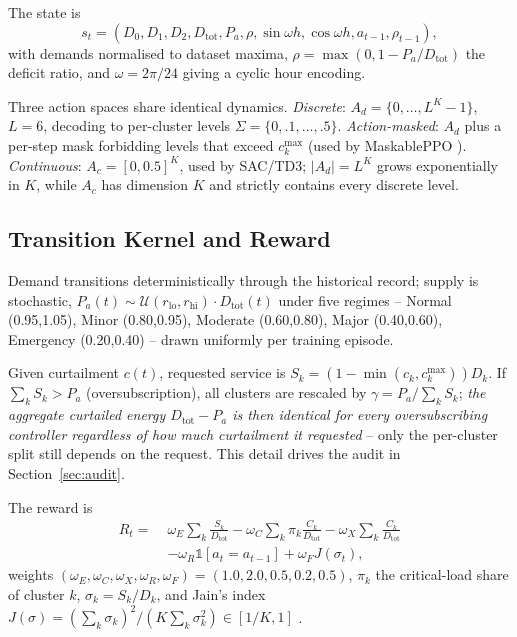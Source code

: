 \documentclass[9pt,conference]{IEEEtran}
\begin{document}
The state is
\begin{equation}
s_t=(D_0,D_1,D_2,D_{\mathrm{tot}},P_a,\rho,\sin\omega h,\cos\omega h,a_{t-1},\rho_{t-1}),
\label{eq:state}
\end{equation}
with demands normalised to dataset maxima, $\rho=\max(0,1-P_a/D_{\mathrm{tot}})$ the deficit ratio, and $\omega=2\pi/24$ giving a cyclic hour encoding.

Three action spaces share identical dynamics. \emph{Discrete}: $A_d=\{0,\dots,L^K{-}1\}$, $L=6$, decoding to per-cluster levels $\Sigma=\{0,.1,\dots,.5\}$. \emph{Action-masked}: $A_d$ plus a per-step mask forbidding levels that exceed $c_k^{\max}$ (used by MaskablePPO \cite{huang2022}). \emph{Continuous}: $A_c=[0,0.5]^K$, used by SAC/TD3; $|A_d|=L^K$ grows exponentially in $K$, while $A_c$ has dimension $K$ and strictly contains every discrete level.

\subsection{Transition Kernel and Reward}
Demand transitions deterministically through the historical record; supply is stochastic, $P_a(t)\sim\mathcal{U}(r_{\mathrm{lo}},r_{\mathrm{hi}})\cdot D_{\mathrm{tot}}(t)$ under five regimes -- Normal (0.95,1.05), Minor (0.80,0.95), Moderate (0.60,0.80), Major (0.40,0.60), Emergency (0.20,0.40) -- drawn uniformly per training episode.

Given curtailment $c(t)$, requested service is $S_k=(1-\min(c_k,c_k^{\max}))D_k$. If $\sum_kS_k>P_a$ (oversubscription), all clusters are rescaled by $\gamma=P_a/\sum_kS_k$; \emph{the aggregate curtailed energy $D_{\mathrm{tot}}-P_a$ is then identical for every oversubscribing controller regardless of how much curtailment it requested} -- only the per-cluster split still depends on the request. This detail drives the audit in Section~\ref{sec:audit}.

The reward is
\begin{equation}
\begin{aligned}
R_t=\;&\omega_E\textstyle\sum_k\frac{S_k}{D_{\mathrm{tot}}}-\omega_C\sum_k\pi_k\frac{C_k}{D_{\mathrm{tot}}}-\omega_X\sum_k\frac{C_k}{D_{\mathrm{tot}}}\\
&-\omega_R\mathbb{1}[a_t{=}a_{t-1}]+\omega_FJ(\sigma_t),
\end{aligned}
\label{eq:reward}
\end{equation}
weights $(\omega_E,\omega_C,\omega_X,\omega_R,\omega_F)=(1.0,2.0,0.5,0.2,0.5)$, $\pi_k$ the critical-load share of cluster $k$, $\sigma_k=S_k/D_k$, and Jain's index $J(\sigma)=(\sum_k\sigma_k)^2/(K\sum_k\sigma_k^2)\in[1/K,1]$ \cite{jain1984}.
\end{document}
